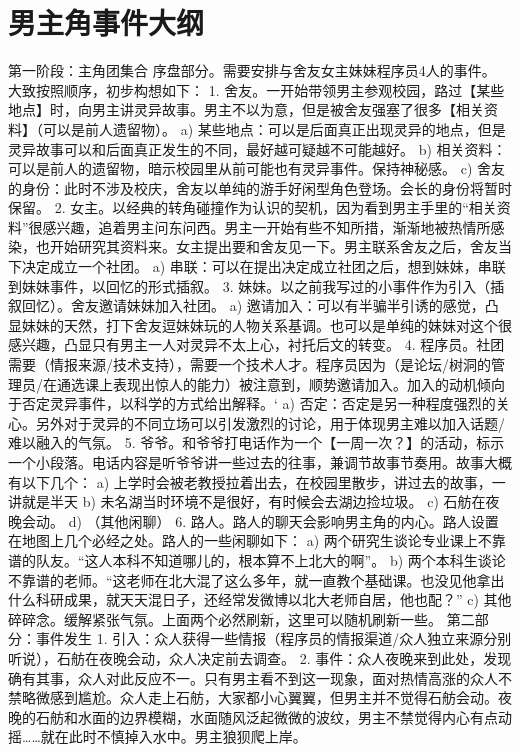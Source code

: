 \section{男主角事件大纲}
\hypertarget{event:nzj}{}
第一阶段：主角团集合
	序盘部分。需要安排与舍友女主妹妹程序员4人的事件。
	大致按照顺序，初步构想如下：
1.	舍友。一开始带领男主参观校园，路过【某些地点】时，向男主讲灵异故事。男主不以为意，但是被舍友强塞了很多【相关资料】（可以是前人遗留物）。
a)	某些地点：可以是后面真正出现灵异的地点，但是灵异故事可以和后面真正发生的不同，最好越可疑越不可能越好。
b)	相关资料：可以是前人的遗留物，暗示校园里从前可能也有灵异事件。保持神秘感。
c)	舍友的身份：此时不涉及校庆，舍友以单纯的游手好闲型角色登场。会长的身份将暂时保留。
2.	女主。以经典的转角碰撞作为认识的契机，因为看到男主手里的“相关资料”很感兴趣，追着男主问东问西。男主一开始有些不知所措，渐渐地被热情所感染，也开始研究其资料来。女主提出要和舍友见一下。男主联系舍友之后，舍友当下决定成立一个社团。
a)	串联：可以在提出决定成立社团之后，想到妹妹，串联到妹妹事件，以回忆的形式插叙。
3.	妹妹。以之前我写过的小事件作为引入（插叙回忆）。舍友邀请妹妹加入社团。
a)	邀请加入：可以有半骗半引诱的感觉，凸显妹妹的天然，打下舍友逗妹妹玩的人物关系基调。也可以是单纯的妹妹对这个很感兴趣，凸显只有男主一人对灵异不太上心，衬托后文的转变。
4.	程序员。社团需要（情报来源/技术支持），需要一个技术人才。程序员因为（是论坛/树洞的管理员/在通选课上表现出惊人的能力）被注意到，顺势邀请加入。加入的动机倾向于否定灵异事件，以科学的方式给出解释。‘
a)	否定：否定是另一种程度强烈的关心。另外对于灵异的不同立场可以引发激烈的讨论，用于体现男主难以加入话题/难以融入的气氛。
5.	爷爷。和爷爷打电话作为一个【一周一次？】的活动，标示一个小段落。电话内容是听爷爷讲一些过去的往事，兼调节故事节奏用。故事大概有以下几个：
a)	上学时会被老教授拉着出去，在校园里散步，讲过去的故事，一讲就是半天
b)	未名湖当时环境不是很好，有时候会去湖边捡垃圾。
c)	石舫在夜晚会动。
d)	（其他闲聊）
6.	路人。路人的聊天会影响男主角的内心。路人设置在地图上几个必经之处。路人的一些闲聊如下：
a)	两个研究生谈论专业课上不靠谱的队友。“这人本科不知道哪儿的，根本算不上北大的啊”。
b)	两个本科生谈论不靠谱的老师。“这老师在北大混了这么多年，就一直教个基础课。也没见他拿出什么科研成果，就天天混日子，还经常发微博以北大老师自居，他也配？”
c)	其他碎碎念。缓解紧张气氛。上面两个必然刷新，这里可以随机刷新一些。
第二部分：事件发生
1.	引入：众人获得一些情报（程序员的情报渠道/众人独立来源分别听说），石舫在夜晚会动，众人决定前去调查。
2.	事件：众人夜晚来到此处，发现确有其事，众人对此反应不一。只有男主看不到这一现象，面对热情高涨的众人不禁略微感到尴尬。众人走上石舫，大家都小心翼翼，但男主并不觉得石舫会动。夜晚的石舫和水面的边界模糊，水面随风泛起微微的波纹，男主不禁觉得内心有点动摇……就在此时不慎掉入水中。男主狼狈爬上岸。
